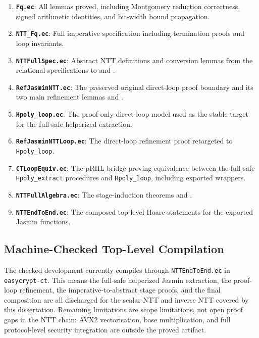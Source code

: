 \begin{enumerate}
  \item \textbf{\texttt{Fq.ec}}: All lemmas proved, including Montgomery
        reduction correctness, signed arithmetic identities, and bit-width
        bound propagation.

  \item \textbf{\texttt{NTT\_Fq.ec}}: Full imperative specification including
        termination proofs and loop invariants.

  \item \textbf{\texttt{NTTFullSpec.ec}}: Abstract NTT definitions and
        conversion lemmas from the relational specifications to
         and .

  \item \textbf{\texttt{RefJasminNTT.ec}}: The preserved original direct-loop
        proof boundary and its two main refinement lemmas
         and .

  \item \textbf{\texttt{Hpoly\_loop.ec}}: The proof-only direct-loop model
        used as the stable target for the full-safe helperized extraction.

  \item \textbf{\texttt{RefJasminNTT\allowbreak Loop.ec}}: The direct-loop refinement
        proof retargeted to \texttt{Hpoly\_loop}.

  \item \textbf{\texttt{CTLoopEquiv.ec}}: The pRHL bridge proving equivalence
        between the full-safe \texttt{Hpoly\_extract} procedures and
        \texttt{Hpoly\_loop}, including exported wrappers.

  \item \textbf{\texttt{NTTFullAlgebra.ec}}: The stage-induction theorems
         and .

  \item \textbf{\texttt{NTTEndToEnd.ec}}: The composed top-level Hoare
        statements for the exported Jasmin functions.
\end{enumerate}

\subsection{Machine-Checked Top-Level Compilation}

The checked development currently compiles through \texttt{NTTEndToEnd.ec} in
\texttt{easycrypt-ct}.  This means the full-safe helperized Jasmin extraction,
the proof-loop refinement, the imperative-to-abstract stage proofs, and the
final composition are all discharged for the scalar NTT and inverse NTT
covered by this dissertation.  Remaining limitations are scope limitations,
not open proof gaps in the NTT chain: AVX2 vectorisation, base multiplication,
and full protocol-level security integration are outside the proved artifact.

